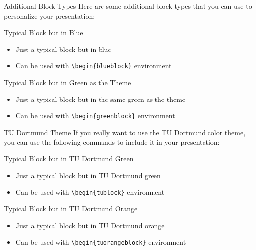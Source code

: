 \documentclass[aspectratio=169,xcolor=dvipsnames]{beamer}
\begin{document}

\begin{frame}{Additional Block Types}
Here are some additional block types that you can use to personalize your presentation:
    \begin{blueblock}{Typical Block but in Blue}
        \begin{itemize}
          \item Just a typical block but in blue
          \item Can be used with \texttt{\textbackslash begin\{blueblock\}} environment
        \end{itemize}
    \end{blueblock}
    \begin{greenblock}{Typical Block but in Green as the Theme}
        \begin{itemize}
          \item Just a typical block but in the same green as the theme
          \item Can be used with \texttt{\textbackslash begin\{greenblock\}} environment
        \end{itemize}
    \end{greenblock}
\end{frame}


\begin{frame}{TU Dortmund Theme}
If you really want to use the TU Dortmund color theme, you can use the following commands to include it in your presentation:
        \begin{tublock}{Typical Block but in TU Dortmund Green}
            \begin{itemize}
              \item Just a typical block but in TU Dortmund green
              \item Can be used with \texttt{\textbackslash begin\{tublock\}} environment
            \end{itemize}
        \end{tublock}
        \begin{tuorangeblock}{Typical Block but in TU Dortmund Orange}
            \begin{itemize}
              \item Just a typical block but in TU Dortmund orange
              \item Can be used with \texttt{\textbackslash begin\{tuorangeblock\}} environment
            \end{itemize}
        \end{tuorangeblock}
\end{frame}
\end{document}
